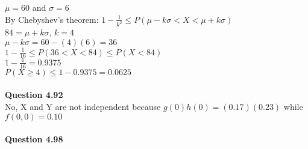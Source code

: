 \documentclass{article}
\begin{document}
        $\mu = 60$ and $\sigma = 6$\\
        By Chebyshev's theorem: $1 - \frac{1}{k^2}\leq P(\mu-k\sigma < X < \mu + k\sigma)$\\
        $84 = \mu + k\sigma$, $k = 4$\\
        $\mu-k\sigma = 60 - (4)(6) = 36$\\
        $1-\frac{1}{16}\leq P(36<X<84)\leq P(X<84)$\\
        $1-\frac{1}{16} = 0.9375$\\
        $P(X\geq 4) \leq 1 - 0.9375 = 0.0625$
        \\\\
    \textbf{Question 4.92}\\
        No, X and Y are not independent because $g(0)h(0) = (0.17)(0.23)$ while $f(0,0)=0.10$
        \\\\
    \textbf{Question 4.98}\\
\end{document}
